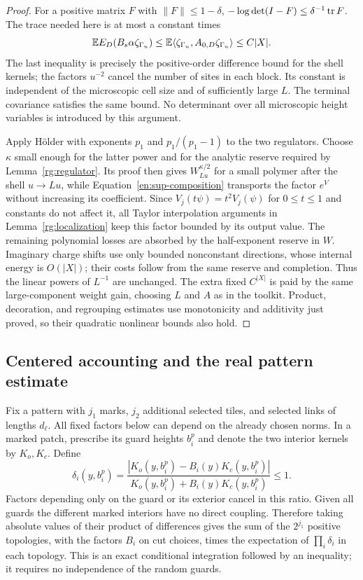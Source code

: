 \begin{proof}
For a positive matrix $F$ with $\|F\|\leq1-\delta$,
$-\log\det(I-F)\leq\delta^{-1}\operatorname{tr} F$.  The trace needed here is at
most a constant times
\[
 \mathbb E E_D(B_s\alpha\zeta_{\Gamma_u})
 \leq\mathbb E\langle \zeta_{\Gamma_u},A_{0,D}\zeta_{\Gamma_u}\rangle
 \leq C|X|.
\]
The last inequality is precisely the positive-order difference bound
for the shell kernels; the factors $u^{-2}$ cancel the number of sites
in each block.  Its constant is independent of the microscopic cell
size and of sufficiently large $L$.  The terminal covariance satisfies
the same bound.  No determinant over all microscopic height variables
is introduced by this argument.

Apply H\"older with exponents $p_1$ and $p_1/(p_1-1)$ to the two
regulators.  Choose $\kappa$ small enough for the latter power and for
the analytic reserve required by Lemma~\ref{rg:regulator}.  Its proof
then gives $W_{Lu}^{\kappa/2}$ for a small polymer after the shell
$u\to Lu$, while
Equation~\eqref{en:sup-composition} transports the factor $e^V$ without
increasing its coefficient.  Since $V_j(t\psi)=t^2V_j(\psi)$ for
$0\leq t\leq1$ and constants do not affect it, all Taylor interpolation
arguments in Lemma~\ref{rg:localization} keep this factor bounded by
its output value.  The remaining polynomial losses are absorbed by
the half-exponent reserve in $W$.  Imaginary charge shifts use only
bounded nonconstant directions, whose internal energy is $O(|X|)$;
their costs follow from the same reserve and completion.  Thus the
linear powers of $L^{-1}$ are unchanged.  The extra fixed $C^{|X|}$
is paid by the same large-component weight gain, choosing $L$ and
$A$ as in the toolkit.  Product, decoration, and regrouping estimates
use monotonicity and additivity just proved, so their quadratic
nonlinear bounds also hold.
\end{proof}

\subsection{Centered accounting and the real pattern estimate}

Fix a pattern with $j_1$ marks, $j_2$ additional selected tiles, and
selected links of lengths $d_\ell$.  All fixed factors below can depend
on the already chosen norms.  In a marked patch, prescribe its guard
heights $b_i^p$ and denote the two interior kernels by $K_o,K_c$.
Define
\begin{equation}\label{en:delta}
 \delta_i(y,b_i^p)=
 \frac{|K_o(y,b_i^p)-B_i(y)K_c(y,b_i^p)|}
 {K_o(y,b_i^p)+B_i(y)K_c(y,b_i^p)}\leq1.
\end{equation}
Factors depending only on the guard or its exterior cancel in this
ratio.  Given all guards the different marked interiors have no direct
coupling.  Therefore taking absolute values of their product of
differences gives the sum of the $2^{j_1}$ positive topologies, with
the factors $B_i$ on cut choices, times the expectation of
$\prod_i\delta_i$ in each topology.  This is an exact conditional
integration followed by an inequality; it requires no independence
of the random guards.

